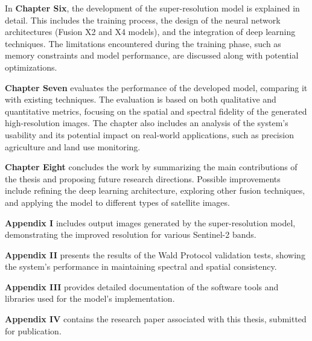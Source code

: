 In \textbf{Chapter Six}, the development of the super-resolution model is explained in detail. This includes the training process, the design of the neural network architectures (Fusion X2 and X4 models), and the integration of deep learning techniques. The limitations encountered during the training phase, such as memory constraints and model performance, are discussed along with potential optimizations.

\textbf{Chapter Seven} evaluates the performance of the developed model, comparing it with existing techniques. The evaluation is based on both qualitative and quantitative metrics, focusing on the spatial and spectral fidelity of the generated high-resolution images. The chapter also includes an analysis of the system's usability and its potential impact on real-world applications, such as precision agriculture and land use monitoring.

\textbf{Chapter Eight} concludes the work by summarizing the main contributions of the thesis and proposing future research directions. Possible improvements include refining the deep learning architecture, exploring other fusion techniques, and applying the model to different types of satellite images.

\textbf{Appendix I} includes output images generated by the super-resolution model, demonstrating the improved resolution for various Sentinel-2 bands.

\textbf{Appendix II} presents the results of the Wald Protocol validation tests, showing the system's performance in maintaining spectral and spatial consistency.

\textbf{Appendix III} provides detailed documentation of the software tools and libraries used for the model's implementation.

\textbf{Appendix IV} contains the research paper associated with this thesis, submitted for publication.
